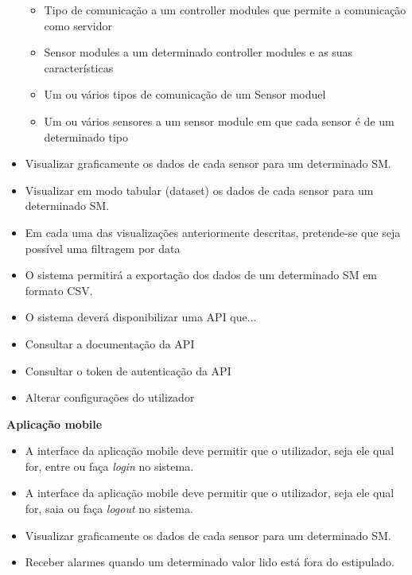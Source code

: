 \begin{itemize}
\begin{itemize}
		\item Tipo de comunicação a um controller modules que permite a comunicação como servidor 
		
		\item Sensor modules a um determinado controller modules e as suas características 
		
		\item Um ou vários tipos de comunicação de um Sensor moduel
		
		\item Um ou vários sensores a um sensor module em que cada sensor é de um determinado tipo 
		
	\end{itemize}
	
	\item Visualizar graficamente os dados de cada sensor para um determinado \ac{SM}. 
	
	
	\item Visualizar em modo tabular (dataset) os dados de cada sensor para um determinado \ac{SM}. 
	
	\item Em cada uma das visualizações anteriormente descritas, pretende-se que seja possível uma filtragem por data
	
	
	\item O sistema permitirá a exportação dos dados de um determinado \ac{SM} em formato \ac{CSV}. 
	
	\item O sistema deverá disponibilizar uma API que...  
	
	\item Consultar a documentação da API 
	
	\item Consultar o token de autenticação da API 
	
	
	
	\item Alterar configurações do utilizador 
	
	
	
\end{itemize}


\textbf{Aplicação mobile}



\begin{itemize}
	\item A interface da aplicação mobile deve permitir que o utilizador, seja ele qual for, entre ou faça \textit{login} no sistema. 
	
	\item A interface da aplicação mobile deve permitir que o utilizador, seja ele qual for, saia ou faça \textit{logout} no sistema.
	
	
	\item Visualizar graficamente os dados de cada sensor para um determinado \ac{SM}. 
	
	\item Receber alarmes quando um determinado valor lido está fora do estipulado.
	
	
\end{itemize}



